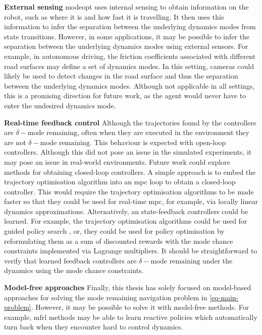 \documentclass{mimosis-class/mimosis}
\numberwithin{equation}{chapter}
\begin{document}
{\textbf{External sensing}
\acrshort{modeopt} uses internal sensing to obtain information on the robot, such as where it is and how fast it is travelling.
It then uses this information to infer the separation between the underlying dynamics modes from state transitions.
However, in some applications, it may be possible to infer the separation between the underlying dynamics modes
using external sensors.
For example, in autonomous driving, the friction coefficients associated with different road surfaces may
define a set of dynamics modes.
In this setting, cameras could likely be used to detect changes in the road surface and thus
the separation between the underlying dynamics modes.
Although not applicable in all settings,
this is a promising direction for future work, as the agent would never have to enter the undesired dynamics mode.

\textbf{Real-time feedback control}
Although the trajectories found by the controllers are \(\delta-\text{mode remaining}\), often when
they are executed in the environment they are not \(\delta-\text{mode remaining}\).
This behaviour is expected with open-loop controllers.
Although this did not pose an issue in the simulated experiments, it may pose an issue in real-world environments.
Future work could explore methods for obtaining closed-loop controllers.
A simple approach is to embed the trajectory optimisation algorithm into an \acrshort{mpc} loop to obtain a
closed-loop controller.
This would require the trajectory optimisation algorithms to be made faster
so that they could be used for real-time \acrshort{mpc}, for example, via locally linear dynamics approximations.
Alternatively, an state-feedback controllers could be learned.
For example, the trajectory optimisation algorithms could be used for guided policy search \citep{levineGuided2013},
or, they could be used for policy optimisation by reformulating them as a sum of discounted rewards
with the mode chance constraints implemented via Lagrange multipliers.
It should be straightforward to verify that learned feedback controllers are
\(\delta-\text{mode remaining}\) under the dynamics using the mode chance constraints.

\textbf{Model-free approaches}
Finally, this thesis has solely focused on model-based approaches for solving the
mode remaining navigation problem in \cref{eq-main-problem}.
However, it may be possible to solve it with model-free methods.
For example, \acrfull{mfrl} methods may be able to learn reactive policies
which automatically turn back when they encounter hard to control dynamics.

}
\end{document}
